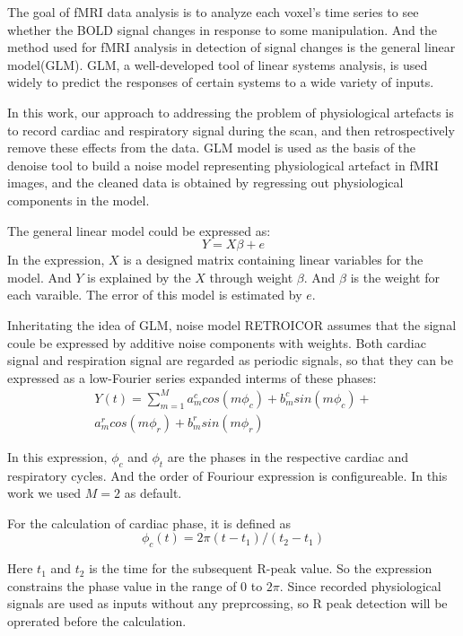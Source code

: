 The goal of fMRI data analysis is to analyze each voxel's time series to see whether the BOLD signal changes in response to some manipulation.\cite{poldrack2011handbook} 
And the method used for fMRI analysis in detection of signal changes is the general linear model(GLM). 
GLM, a well-developed tool of linear systems analysis, is used widely to predict the responses of certain systems to a wide variety of inputs.\cite{cohen1997parametric}

In this work, our approach to addressing the problem of physiological artefacts is to record cardiac and respiratory signal during the scan, and then retrospectively remove these effects from the data.\cite{glover2000image} 
GLM model is used as the basis of the denoise tool to build a noise model representing physiological artefact in fMRI images, and the cleaned data is obtained by regressing out physiological components in the model.

The general linear model could be expressed as:
\begin{equation}
\label{eqn:glm}
    Y = X\beta + e
\end{equation}
In the expression, $X$ is a designed matrix containing linear variables for the model. And $Y$ is explained by the $X$ through weight $\beta$. And $\beta$ is the weight for each varaible. The error of this model is estimated by $e$.

Inheritating the idea of GLM, noise model RETROICOR assumes that the signal coule be expressed by additive noise components with weights. Both cardiac signal and respiration signal are regarded as periodic signals, so that they can be expressed as a low-Fourier series expanded interms of these phases:
\begin{multline}
    Y(t) = \sum_{m = 1}^{M} a_m^c cos(m\phi_c) + b_m^c sin(m\phi_c) + \\ a_m^r cos(m\phi_r) + b_m^r sin(m\phi_r)
\end{multline}

In this expression, $\phi_c$ and $\phi_t$ are the phases in the respective cardiac and respiratory cycles. 
And the order of Fouriour expression is configureable. In this work we used $M = 2$ as default.

For the calculation of cardiac phase, it is defined as
\begin{equation}
\label{eqn:cardiac}
    \phi_c(t) = 2\pi(t-t_1)/(t_2-t_1)
\end{equation}

Here $t_1$ and $t_2$ is the time for the subsequent R-peak value. 
So the expression constrains the phase value in the range of $0$ to $2\pi$. 
Since recorded physiological signals are used as inputs without any preprcossing, so R peak detection will be oprerated before the calculation.

